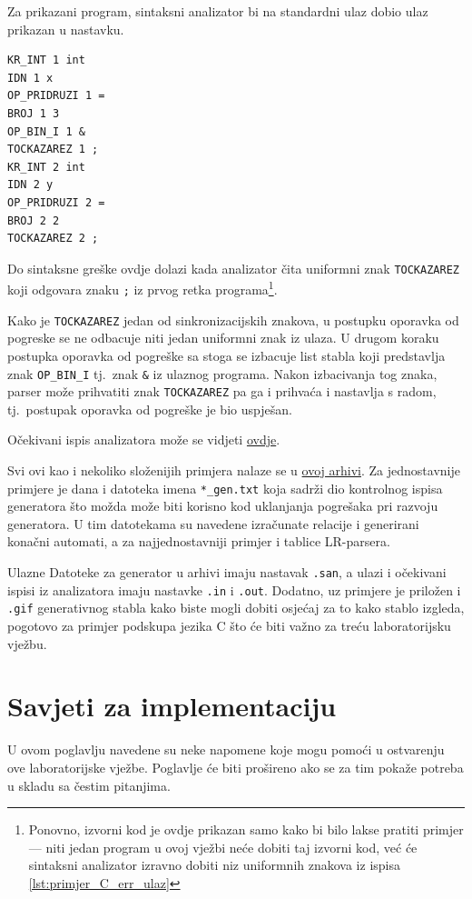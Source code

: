 \documentclass[times, 12pt, utf8]{book}
\begin{document}
Za prikazani program, sintaksni analizator bi na standardni ulaz dobio ulaz prikazan u nastavku.

\begin{lstlisting}[caption={Ulaz za sintaksni analizator za program \ref{lst:primjer_C_err}.},label=lst:primjer_C_err_ulaz]
KR_INT 1 int
IDN 1 x
OP_PRIDRUZI 1 =
BROJ 1 3
OP_BIN_I 1 &
TOCKAZAREZ 1 ;
KR_INT 2 int
IDN 2 y
OP_PRIDRUZI 2 =
BROJ 2 2
TOCKAZAREZ 2 ;
\end{lstlisting}

Do sintaksne greške ovdje dolazi kada analizator čita uniformni znak \verb|TOCKAZAREZ| koji odgovara znaku \verb|;| iz prvog retka programa\footnote{Ponovno, izvorni kod je ovdje prikazan samo kako bi bilo lakse pratiti primjer --- niti jedan program u ovoj vježbi neće dobiti taj izvorni kod, već će sintaksni analizator izravno dobiti niz uniformnih znakova iz ispisa \ref{lst:primjer_C_err_ulaz}}.

Kako je \verb|TOCKAZAREZ| jedan od sinkronizacijskih znakova, u postupku oporavka od pogreske se ne odbacuje niti jedan uniformni znak iz ulaza.
U drugom koraku postupka oporavka od pogreške sa stoga se izbacuje list stabla koji predstavlja znak \verb|OP_BIN_I| tj.~znak \verb|&| iz ulaznog programa.
Nakon izbacivanja tog znaka, parser može prihvatiti znak \verb|TOCKAZAREZ| pa ga i prihvaća i nastavlja s radom, tj.~postupak oporavka od pogreške je bio uspješan.

Očekivani ispis analizatora može se vidjeti \href{https://github.com/fer-ppj/ppj-labosi/raw/master/res/lab2/simplePpjLang_err.out}{ovdje}.

Svi ovi kao i nekoliko složenijih primjera nalaze se u \href{https://github.com/fer-ppj/ppj-labosi/raw/master/res/lab2/langdefs.zip}{ovoj arhivi}.
Za jednostavnije primjere je dana i datoteka imena \verb|*_gen.txt| koja sadrži dio kontrolnog ispisa generatora što možda može biti korisno kod uklanjanja pogrešaka pri razvoju generatora.
U tim datotekama su navedene izračunate relacije i generirani konačni automati, a za najjednostavniji primjer i tablice LR-parsera.

Ulazne Datoteke za generator u arhivi imaju nastavak \verb|.san|, a ulazi i očekivani ispisi iz analizatora imaju nastavke \verb|.in| i \verb|.out|.
Dodatno, uz primjere je priložen i \verb|.gif| generativnog stabla kako biste mogli dobiti osjećaj za to kako stablo izgleda, pogotovo za primjer podskupa jezika C što će biti važno za treću laboratorijsku vježbu.

\section{Savjeti za implementaciju}
U ovom poglavlju navedene su neke napomene koje mogu pomoći u ostvarenju ove laboratorijske vježbe.
Poglavlje će biti prošireno ako se za tim pokaže potreba u skladu sa čestim pitanjima.
\end{document}
